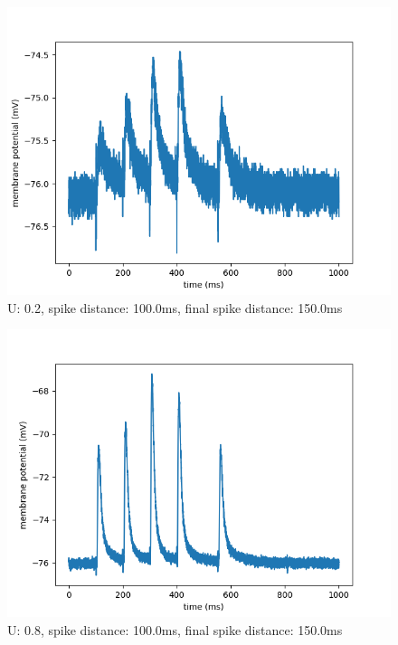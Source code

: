 \documentclass[10pt,a4paper]{scrartcl}
\begin{document}
\begin{figure} [ht]
\begin{center}
\label{fig:abb17}
\caption{U: 0.2, spike distance: 100.0ms, final spike distance: 150.0ms}
\includegraphics[scale=0.35]{pictures/final_spike_variation_7.pdf} 
\end{center}
\end{figure}

\newpage

\begin{figure} [ht]
\begin{center}
\label{fig:abb18}
\caption{U: 0.8, spike distance: 100.0ms, final spike distance: 150.0ms}
\includegraphics[scale=0.35]{pictures/final_spike_variation_8.pdf} 
\end{center}
\end{figure}
\end{document}
